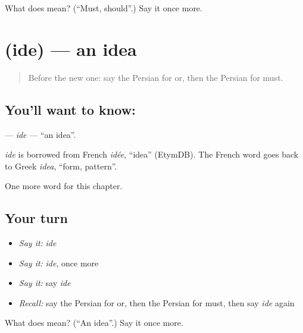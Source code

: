 \begin{tcolorbox}[breakable,colback=teal!4,colframe=teal!35!black,title={Before you move on}]
What does  mean? (\textquotedblleft{}Must, should\textquotedblright{}.) Say it once more.
\end{tcolorbox}
\section[\texorpdfstring{\fa{ایده} (ide)}{ایده (ide)}]{ (ide) — an idea}

\label{lesson:FA-C198-ide}



\begin{quote}
Before the new one: say the Persian for or, then the Persian for must.
\end{quote}

\subsection*{You'll want to know: }
\textbf{} — \emph{ide} — \textquotedblleft{}an idea\textquotedblright{}.

\begin{cousinweb}
\emph{ide} is borrowed from French \emph{idée}, \textquotedblleft{}idea\textquotedblright{} (EtymDB). The French word goes back to Greek \emph{idea}, \textquotedblleft{}form, pattern\textquotedblright{}.
\end{cousinweb}

\begin{grammarlens}[title={What you've built}]
One more word for this chapter.
\end{grammarlens}

\subsection*{Your turn}
\begin{itemize}
\raggedright
  \item \emph{Say it:} \emph{ide}
  \item \emph{Say it:} \emph{ide}, once more
  \item \emph{Say it:} say \emph{ide}
  \item \emph{Recall:} say the Persian for or, then the Persian for must, then say \emph{ide} again
\end{itemize}

\begin{tcolorbox}[breakable,colback=teal!4,colframe=teal!35!black,title={Before you move on}]
What does  mean? (\textquotedblleft{}An idea\textquotedblright{}.) Say it once more.
\end{tcolorbox}
